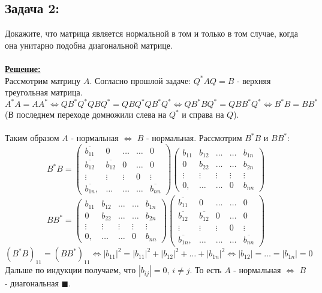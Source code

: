 \documentclass[a4paper,12pt,titlepage,final]{article}
\begin{document}
\subsection*{Задача 2:}
\noindent Докажите, что матрица является нормальной в том и только в том случае, когда она унитарно подобна диагональной матрице.\\ \\
\textbf{\underline{Решение:}} \\
Рассмотрим матрицу $A$. Согласно прошлой задаче: $Q^*AQ = B$ - верхняя треугольная матрица.
$$ A^*A = AA^* \Leftrightarrow QB^*Q^*QBQ^* = QBQ^*QB^*Q^* \Leftrightarrow  QB^*BQ^* = QBB^*Q^* \Leftrightarrow B^*B = BB^*$$
(В последнем переходе домножили слева на $Q^*$ и справа на $Q$).\\\\
Таким образом $A$ - нормальная $\Leftrightarrow$ $B$ - нормальная. Рассмотрим $B^*B$ и $BB^*$:
$$
B^*B = 
\begin{pmatrix}
    \overline{b_{11}} & 0 & \ldots & \ldots & 0 \\
    \overline{b_{12}} & \overline{b_{12}} & 0 & \ldots & 0 \\
    \vdots & \vdots &\vdots & 0 & \vdots \\
    \overline{b_{1n}}, & \ldots & \ldots & \ldots & \overline{b_{nn}}
\end{pmatrix}
\begin{pmatrix}
    b_{11} & b_{12} & \ldots & \ldots & b_{1n} \\
    0 & b_{22} & \ldots & \ldots & b_{2n} \\
    \vdots & \vdots &\vdots & \vdots & \vdots \\
    0, & \ldots & \ldots & 0 & b_{nn}
\end{pmatrix}
$$
$$
BB^* =
\begin{pmatrix}
    b_{11} & b_{12} & \ldots & \ldots & b_{1n} \\
    0 & b_{22} & \ldots & \ldots & b_{2n} \\
    \vdots & \vdots &\vdots & \vdots & \vdots \\
    0, & \ldots & \ldots & 0 & b_{nn}
\end{pmatrix}
\begin{pmatrix}
    \overline{b_{11}} & 0 & \ldots & \ldots & 0 \\
    \overline{b_{12}} & \overline{b_{12}} & 0 & \ldots & 0 \\
    \vdots & \vdots &\vdots & 0 & \vdots \\
    \overline{b_{1n}}, & \ldots & \ldots & \ldots & \overline{b_{nn}}
\end{pmatrix}
$$
$$ (B^*B)_{11} = (BB^*)_{11} \Leftrightarrow |b_{11}|^2 = |b_{11}|^2 + |b_{12}|^2 + \ldots + |b_{1n}|^2 \Leftrightarrow |b_{12}| = \ldots = |b_{1n}| = 0 $$
Дальше по индукции получаем, что $|b_{ij}| = 0, \, i \neq j$. То есть $A$ - нормальная $\Leftrightarrow$ $B$ - диагональная $\blacksquare$. \\ \\ \\
\end{document}
